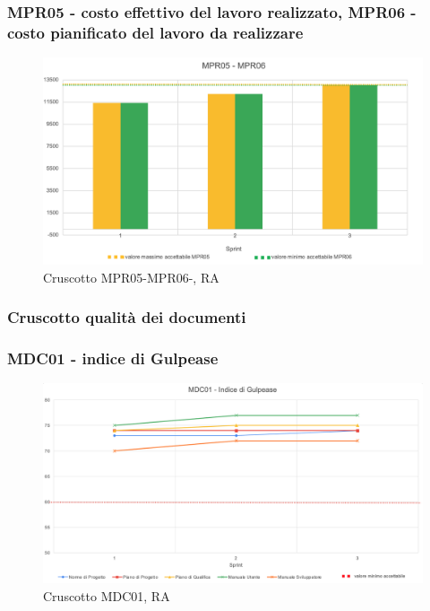 \subsubsection*{MPR05 - costo effettivo del lavoro realizzato, MPR06 - costo pianificato del lavoro da realizzare}

\begin{figure}[H] 
    \centering
    \includegraphics[scale = 0.7]{immagini/ImmRA/MPR0506.png}
    \caption{Cruscotto MPR05-MPR06-, RA}
\end{figure}

\subsubsection{Cruscotto qualità dei documenti}
\subsubsection*{MDC01 - indice di Gulpease}

\begin{figure}[H] 
    \centering
    \includegraphics[scale = 0.6]{immagini/ImmRA/MDC01.png}
    \caption{Cruscotto MDC01, RA}
\end{figure}

